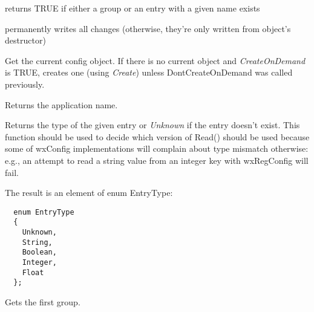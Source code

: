 
returns TRUE if either a group or an entry with a given name exists

\label{wxconfigbaseflush}


permanently writes all changes (otherwise, they're only written from object's
destructor)

\label{wxconfigbaseget}


Get the current config object. If there is no current object and
{\it CreateOnDemand} is TRUE, creates one
(using {\it Create}) unless DontCreateOnDemand was called previously.

\label{wxconfigbasegetappname}


Returns the application name.

\label{wxconfigbasegetentrytype}


Returns the type of the given entry or {\it Unknown} if the entry doesn't
exist. This function should be used to decide which version of Read() should
be used because some of wxConfig implementations will complain about type
mismatch otherwise: e.g., an attempt to read a string value from an integer
key with wxRegConfig will fail.

The result is an element of enum EntryType:

\begin{verbatim}
  enum EntryType
  {
    Unknown,
    String,
    Boolean,
    Integer,
    Float
  };
\end{verbatim}

\label{wxconfigbasegetfirstgroup}


Gets the first group.


